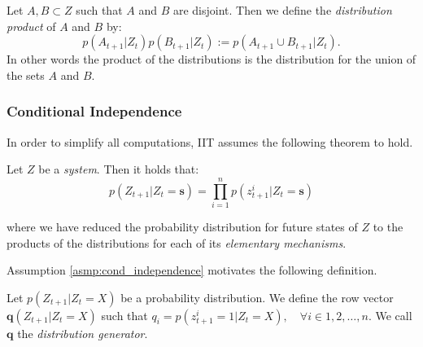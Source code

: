 

\begin{definition}
	\label{def:dist_prod}
	Let $A, B \subset Z$ such that $A$ and $B$ are disjoint. Then we define the \textit{distribution product} of $A$ and $B$ by:
	\[p(A_{t+1}|Z_t)p(B_{t+1}|Z_t):=p(A_{t+1} \cup B_{t+1}|Z_t).\]
	In other words the product of the distributions is the distribution for the union of the sets $A$ and $B$.
\end{definition} 

\subsubsection{Conditional Independence}
\label{sec:conditional_independence}
In order to simplify all computations, IIT \cite{oizumi2014phenomenology} assumes the following theorem to hold.

\begin{assumption}
	\label{asmp:cond_independence}
	Let $Z$ be a \textit{system}. Then it holds that:
	\begin{equation}
	\label{eq:cond_independence}
	p(Z_{t+1}|Z_t = \mathbf{s}) = \prod \limits_{i=1}^{n} p(z^i_{t+1}|Z_t=\mathbf{s})
	\end{equation}
	
	where we have reduced the probability distribution for future states of $Z$ to the products of the distributions for each of its \textit{elementary mechanisms}. 
\end{assumption}

Assumption \ref{asmp:cond_independence} motivates the following definition.

\begin{definition}
	\label{def:generator}
	Let $p(Z_{t+1}|Z_t = X)$ be a probability distribution. We define the row vector $\mathbf{q}(Z_{t+1}|Z_t = X)$ such that $q_i = p(z^i_{t+1}=1|Z_t=X), \quad \forall i \in 1, 2, \ldots, n$. We call $\mathbf{q}$ the \textit{distribution generator}.
\end{definition}

